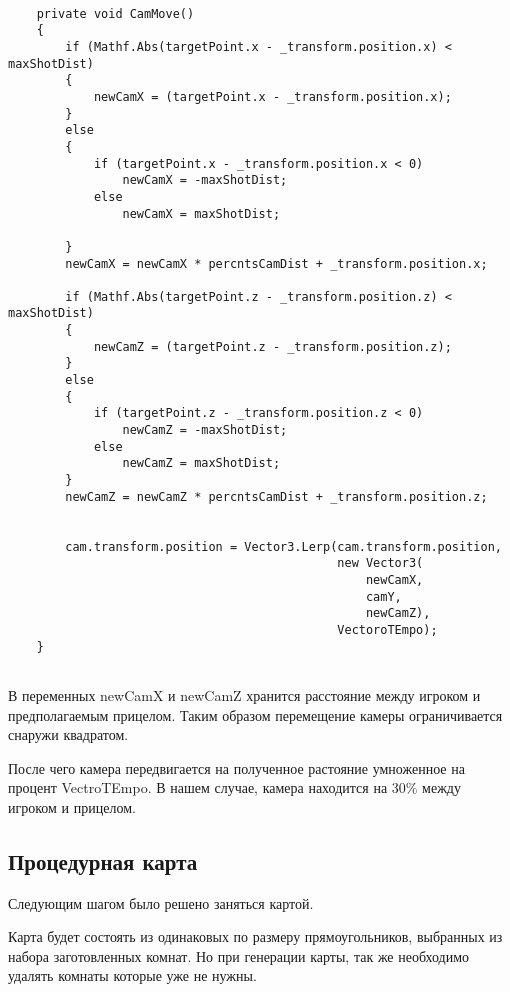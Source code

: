 \documentclass[14pt, titlepage,fleqn,a4paper]{extarticle}
\begin{document}
    \begin{lstlisting}[caption= Функция передвижения камеры, label=lst:test]
    
    private void CamMove()
    {
        if (Mathf.Abs(targetPoint.x - _transform.position.x) < maxShotDist)
        {
            newCamX = (targetPoint.x - _transform.position.x);
        }
        else
        {
            if (targetPoint.x - _transform.position.x < 0)
                newCamX = -maxShotDist;
            else
                newCamX = maxShotDist;

        }
        newCamX = newCamX * percntsCamDist + _transform.position.x;

        if (Mathf.Abs(targetPoint.z - _transform.position.z) < maxShotDist)
        {
            newCamZ = (targetPoint.z - _transform.position.z);
        }
        else
        {
            if (targetPoint.z - _transform.position.z < 0)
                newCamZ = -maxShotDist;
            else
                newCamZ = maxShotDist;
        }
        newCamZ = newCamZ * percntsCamDist + _transform.position.z;


        cam.transform.position = Vector3.Lerp(cam.transform.position,
                                              new Vector3(
                                                  newCamX,
                                                  camY,
                                                  newCamZ),
                                              VectoroTEmpo);
    }
    
    \end{lstlisting}
    
    В переменных newCamX и newCamZ хранится расстояние между игроком и предполагаемым прицелом. Таким образом перемещение камеры ограничивается снаружи квадратом.
    
    После чего камера передвигается на полученное растояние умноженное на процент VectroTEmpo. В нашем случае, камера находится на 30\% между игроком и прицелом.
    
    \subsection*{Процедурная карта}
	
	Следующим шагом было решено заняться картой.
	
	Карта будет состоять из одинаковых по размеру прямоугольников, выбранных из набора заготовленных комнат.
	Но при генерации карты, так же необходимо удалять комнаты которые уже не нужны.
	
\end{document}
